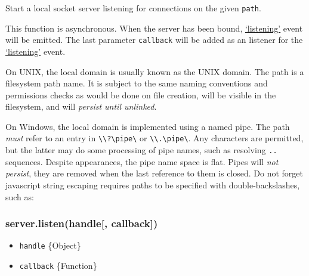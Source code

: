 Start a local socket server listening for connections on the given
\texttt{path}.

This function is asynchronous. When the server has been bound,
\hyperref[netux5feventux5flistening]{`listening'} event will be emitted.
The last parameter \texttt{callback} will be added as an listener for
the \hyperref[netux5feventux5flistening]{`listening'} event.

On UNIX, the local domain is usually known as the UNIX domain. The path
is a filesystem path name. It is subject to the same naming conventions
and permissions checks as would be done on file creation, will be
visible in the filesystem, and will \emph{persist until unlinked}.

On Windows, the local domain is implemented using a named pipe. The path
\emph{must} refer to an entry in
\texttt{\textbackslash{}\textbackslash{}?\textbackslash{}pipe\textbackslash{}}
or
\texttt{\textbackslash{}\textbackslash{}.\textbackslash{}pipe\textbackslash{}}.
Any characters are permitted, but the latter may do some processing of
pipe names, such as resolving \texttt{..} sequences. Despite
appearances, the pipe name space is flat. Pipes will \emph{not persist},
they are removed when the last reference to them is closed. Do not
forget javascript string escaping requires paths to be specified with
double-backslashes, such as:

\begin{Shaded}
\begin{Highlighting}[]
\NormalTok{(}
    \NormalTok{(}\CharTok{\textbackslash{}\textbackslash{}\textbackslash{}\textbackslash{}}\CharTok{\textbackslash{}\textbackslash{}}\NormalTok{, }\NormalTok{(), }\NormalTok{))}
\end{Highlighting}
\end{Shaded}

\subsubsection{server.listen(handle{[},
callback{]})}\label{server.listenhandle-callback}

\begin{itemize}
\itemsep1pt\parskip0pt
\item
  \texttt{handle} \{Object\}
\item
  \texttt{callback} \{Function\}
\end{itemize}

